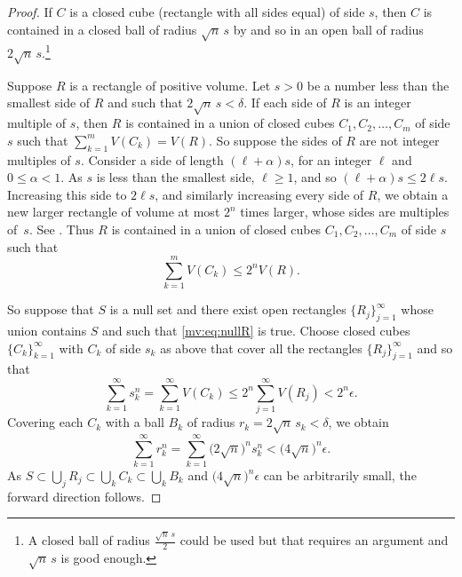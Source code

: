 \begin{proof}
If $C$ is a closed cube (rectangle with all sides equal) of side $s$,
then $C$ is contained in a closed ball of radius
$\sqrt{n}\, s$ by  and so
in an open ball of radius $2 \sqrt{n}\, s$.\footnote{%
A closed ball of radius $\frac{\sqrt{n}\,s}{2}$
could be used but that requires an argument and 
$\sqrt{n}\, s$ is good enough.}

Suppose $R$ is a rectangle of positive volume.
Let $s > 0$ be a number less than the smallest side of $R$ and
such that $2\sqrt{n} \, s < \delta$.
If each side of $R$ is an integer multiple of $s$, then $R$ is
contained in a union of closed cubes
$C_1, C_2, \ldots, C_m$ of side $s$ such that
$\sum_{k=1}^m V(C_k) = V(R)$.  So suppose the sides
of $R$ are not integer multiples of $s$.
Consider a side of length $(\ell+\alpha) s$, for
an integer $\ell$ and $0 \leq \alpha < 1$.  As $s$ is less than the smallest
side, $\ell \geq 1$, and so $(\ell+\alpha)s \leq 2\ell s$.
Increasing this side to $2\ell s$,
and similarly increasing every side of $R$, we obtain a new larger
rectangle of volume at most $2^n$ times larger, whose sides are
multiples of~$s$.  See .
Thus $R$ is contained in a union of
closed cubes $C_1, C_2, \ldots, C_m$ of side $s$ such that
\begin{equation*}
\sum_{k=1}^m V(C_k) \leq 2^n V(R) .
\end{equation*}

\begin{myfigureht}
\caption{Covering a rectangle by cubes of total size at most $2^n V(R)$.\label{fig:nullrectcube}}
\end{myfigureht}

So suppose that $S$ is a null set and
there exist open rectangles $\{ R_j \}_{j=1}^\infty$ whose union contains $S$ and such that
\eqref{mv:eq:nullR} is true.  Choose closed
cubes $\{ C_k \}_{k=1}^\infty$ with $C_k$ of side $s_k$ as above that cover
all the rectangles $\{ R_j \}_{j=1}^\infty$ and so that
\begin{equation*}
\sum_{k=1}^\infty s_k^n =
\sum_{k=1}^\infty V(C_k) \leq
2^n \sum_{j=1}^\infty V(R_j)
< 2^n \epsilon.
\end{equation*}
Covering each $C_k$ with a ball $B_k$ of radius $r_k = 2\sqrt{n} \, s_k < \delta$,
we obtain 
\begin{equation*}
\sum_{k=1}^\infty r_k^n
=
\sum_{k=1}^\infty {\bigl(2\sqrt{n}\bigr)}^n s_k^n
<
{\bigl(4\sqrt{n}\bigr)}^n \epsilon .
\end{equation*}
As $S \subset\bigcup_{j} R_j \subset \bigcup_{k} C_k \subset \bigcup_{k}
B_k$ and ${\bigl(4\sqrt{n}\bigr)}^n \epsilon$ can be arbitrarily small,
the forward direction follows.


\end{proof}
